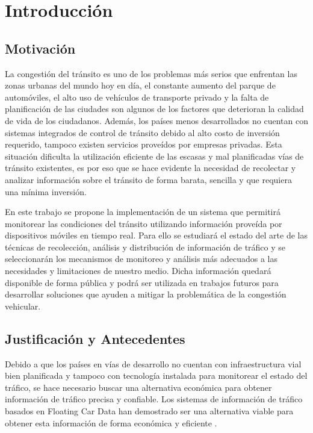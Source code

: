 \chapter{Introducción}
\label{cap:1}

\section{Motivación}

La congestión del tránsito es uno de los problemas más serios que enfrentan las zonas urbanas del mundo hoy en día, el constante aumento del parque de automóviles, el alto uso de vehículos de transporte privado y la falta de planificación de las ciudades son algunos de los factores que deterioran la calidad de vida de los ciudadanos. Además, los países menos desarrollados no cuentan con sistemas integrados de control de tránsito debido al alto costo de inversión requerido, tampoco existen servicios proveídos por empresas privadas. Esta situación dificulta la utilización eficiente de las escasas y mal planificadas vías de tránsito existentes, es por eso que se hace evidente la necesidad de recolectar y analizar información sobre el tránsito de forma barata, sencilla y que requiera una mínima inversión.

En este trabajo se propone la implementación de un sistema que permitirá monitorear las condiciones del tránsito utilizando información proveída por dispositivos móviles en tiempo real. Para ello se estudiará el estado del arte de las técnicas de recolección, análisis y distribución de información de tráfico y se seleccionarán los mecanismos de monitoreo y análisis más adecuados a las necesidades y limitaciones de nuestro medio. Dicha información quedará disponible de forma pública y podrá ser utilizada en trabajos futuros para desarrollar soluciones que ayuden a mitigar la problemática de la congestión vehicular.

\section{Justificación y Antecedentes}

Debido a que los países en vías de desarrollo no cuentan con infraestructura vial bien planificada y tampoco con tecnología 
instalada para monitorear el estado del tráfico, se hace necesario buscar una alternativa económica para obtener información de tráfico precisa y confiable. Los sistemas de información de tráfico basados en Floating Car Data han demostrado ser una alternativa viable para obtener esta información de forma económica y eficiente \cite{schafer2002traffic,reinthaler2007evaluation}.

